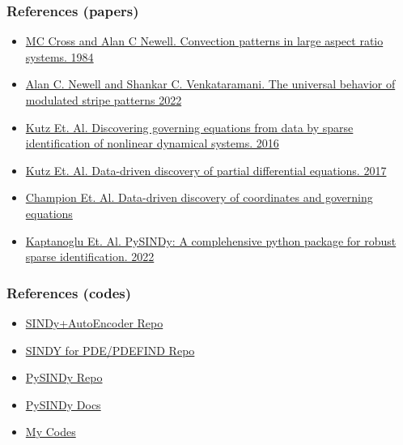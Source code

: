 \documentclass[]{beamer}
\begin{document}
\begin{frame}
    \frametitle{References (papers)}
    \begin{itemize}
    \item \href{https://reader.elsevier.com/reader/sd/pii/0167278984901817?token=A7642367BF58BF047EA0B36FF9405D2765AECE238093AEE2121CD36F6E79244B94C8B9C1B05FEAC38C9E9A6C6C6C37DC&originRegion=us-east-1&originCreation=20221012224737}{MC Cross and Alan C Newell. Convection patterns in large aspect ratio systems. 1984}
    \item \href{https://www.cmu.edu/cee/convergence/preprints/UniversalBehaviorModulatedStripePatterns.pdf}{Alan C. Newell and Shankar C. Venkataramani. The universal behavior of modulated stripe patterns 2022}
    \item \href{https://www.pnas.org/doi/pdf/10.1073/pnas.1517384113}{Kutz Et. Al. Discovering governing equations from data by sparse identification of nonlinear dynamical systems. 2016}
    \item \href{https://www.science.org/doi/pdf/10.1126/sciadv.1602614}{Kutz Et. Al. Data-driven discovery of partial differential equations. 2017}
    \item \href{https://www.pnas.org/doi/pdf/10.1073/pnas.1906995116}{Champion Et. Al. Data-driven discovery of coordinates and governing equations}
    \item \href{https://arxiv.org/pdf/2111.08481.pdf)}{Kaptanoglu Et. Al. PySINDy: A complehensive python package for robust sparse identification. 2022}
    \end{itemize}
\end{frame}
\begin{frame}
    \frametitle{References (codes)}
    \begin{itemize}
    \item \href{https://github.com/kpchamp/SindyAutoencoders}{SINDy+AutoEncoder Repo}
    \item \href{https://github.com/snagcliffs/PDE-FIND}{SINDY for PDE/PDEFIND Repo}
    \item \href{https://github.com/dynamicslab/pysindy}{PySINDy Repo}
    \item \href{https://pysindy.readthedocs.io/en/latest/}{PySINDy Docs}
    \item \href{https://github.com/EMcDugald/convection_patterns}{My Codes}
    \end{itemize}
\end{frame}
\end{document}
